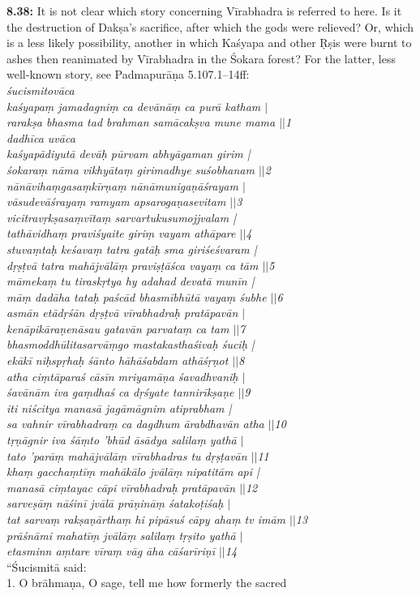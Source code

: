 \documentclass{article}
\newcommand{\vsnum}[1]{\textbf{#1}}
\newcommand{\skt}[1]{\textit{#1}}
\begin{document}
\vsnum{8.38: }It is not clear which story concerning Vīrabhadra is referred to here. Is it the destruction of Dakṣa's sacrifice, after which the gods were relieved? Or, which is a less likely possibility, another in which Kaśyapa and other Ṛṣis were burnt to ashes then reanimated by Vīrabhadra in the Śokara forest? For the latter, less well-known story, see Padmapurāṇa 5.107.1--14ff:\\ \skt{śucismitovāca \\ kaśyapaṃ jamadagniṃ ca devānāṃ ca purā katham $|$\\ rarakṣa bhasma tad brahman samācakṣva mune mama $||$1 \\ dadhīca uvāca \\ kaśyapādiyutā devāḥ pūrvam abhyāgaman girim |\\ śokaraṃ nāma vikhyātaṃ girimadhye suśobhanam $||$2 \\ nānāvihaṃgasaṃkīrṇaṃ nānāmunigaṇāśrayam $|$\\ vāsudevāśrayaṃ ramyam apsarogaṇasevitam $||$3 \\ vicitravṛkṣasaṃvītaṃ sarvartukusumojjvalam |\\ tathāvidhaṃ praviśyaite giriṃ vayam athāpare $||$4 \\ stuvaṃtaḥ keśavaṃ tatra gatāḥ sma giriśeśvaram |\\ dṛṣṭvā tatra mahājvālāṃ praviṣṭāśca vayaṃ ca tām $||$5 \\ māmekaṃ tu tiraskṛtya hy adahad devatā munīn |\\ māṃ dadāha tataḥ paścād bhasmībhūtā vayaṃ śubhe $||$6\\ asmān etādṛśān dṛṣṭvā vīrabhadraḥ pratāpavān $|$\\ kenāpikāraṇenāsau gatavān parvataṃ ca tam $||$7 \\ bhasmoddhūlitasarvāṃgo mastakasthaśivaḥ śuciḥ |\\ ekākī niḥspṛhaḥ śānto hāhāśabdam athāśṛṇot $||$8 \\ atha ciṃtāparaś cāsīn mriyamāṇa śavadhvaniḥ $|$\\ śavānām iva gaṃdhaś ca dṛśyate tannirīkṣaṇe $||$9 \\ iti niścitya manasā jagāmāgnim atiprabham |\\ sa vahnir vīrabhadraṃ ca dagdhum ārabdhavān atha $||$10 \\ tṛṇāgnir iva śāṃto 'bhūd āsādya salilaṃ yathā $|$\\ tato 'parāṃ mahājvālāṃ vīrabhadras tu dṛṣṭavān $||$11 \\ khaṃ gacchaṃtīṃ mahākālo jvālāṃ nipatitām api |\\ manasā ciṃtayac cāpi vīrabhadraḥ pratāpavān $||$12 \\ sarveṣāṃ nāśinī jvālā prāṇināṃ śatakoṭiśaḥ $|$\\ tat sarvaṃ rakṣaṇārthaṃ hi pipāsuś cāpy ahaṃ tv imām $||$13 \\ prāśnāmi mahatīṃ jvālāṃ salilaṃ tṛṣito yathā $|$\\ etasminn aṃtare vīraṃ vāg āha cāśarīriṇī $||$14} \\  ``Śucismitā said:\\  1. O brāhmaṇa, O sage, tell me how formerly the sacred 
\end{document}
